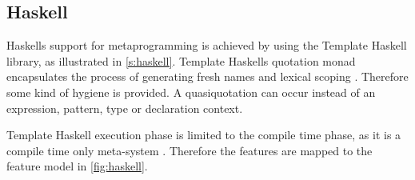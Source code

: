 \subsection{Haskell}

Haskells support for metaprogramming is achieved by using the Template Haskell library, as illustrated in \autoref{s:haskell}.
Template Haskells quotation monad encapsulates the process of generating fresh names and lexical scoping \cite{sheard2002template}.
Therefore some kind of hygiene is provided.
A quasiquotation can occur instead of an expression, pattern, type or declaration context.

Template Haskell execution phase is limited to the compile time phase, as it is a compile time only meta-system \cite{sheard2002template}.
Therefore the features are mapped to the feature model in \autoref{fig:haskell}.


